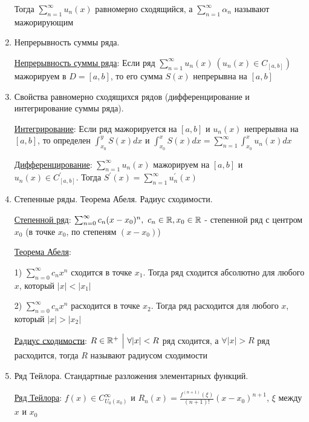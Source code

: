 \documentclass[12pt]{article}
\begin{document}
\begin{enumerate}
    Тогда $\sum_{n = 1}^\infty u_n(x)$ равномерно сходящийся, а $\sum_{n = 1}^\infty \alpha_n$ называют мажорирующим

    \item Непрерывность суммы ряда.

    \hyperlink{functionalsumcontinuity}{Непрерывность суммы ряда}: \Ths Если ряд $\sum_{n = 1}^\infty u_n(x) \ (u_n(x) \in C_{[a, b]})$ мажорируем в $D = [a, b]$, то 
    его сумма $S(x)$ непрерывна на $[a, b]$

    \item Свойства равномерно сходящихся рядов (дифференцирование и интегрирование суммы
    ряда).

    \hyperlink{functionalsumintegral}{Интегрирование}: \Ths Если ряд мажорируется на $[a, b]$ и $u_n(x)$ непрерывна на $[a, b]$, то определен $\int_{x_0}^y S(x)dx$ и 
    $\int_{x_0}^x S(x)dx  = \sum_{n = 1}^\infty \int_{x_0}^x u_n(x) dx$

    \hyperlink{functionalsumderivative}{Дифференцирование}: \Ths $\sum_{n = 1}^\infty u_n(x)$ мажорируем на $[a, b]$ и $u_n(x) \in C^\prime_{[a, b]}$.
    Тогда $S^\prime(x) = \sum_{n = 1}^\infty u^\prime_n(x)$

    \item Степенные ряды. Теорема Абеля. Радиус сходимости.

    \hyperlink{powerseries}{Степенной ряд}: $\sum_{n = 0}^\infty c_n(x - x_0)^n, \ c_n \in \mathbb{R}, x_0 \in \mathbb{R}$ - степенной ряд с центром $x_0$ (в точке $x_0$, по степеням $(x - x_0)$)

    \hyperlink{abelstheorem}{Теорема Абеля}:  

    1) $\sum_{n = 0}^\infty c_n x^n$ сходится в точке $x_1$. Тогда ряд сходится абсолютно для любого $x$, который $|x| < |x_1|$

    2) $\sum_{n = 0}^\infty c_n x^n$ расходится в точке $x_2$. Тогда ряд расходится для любого $x$, который $|x| > |x_2|$

    \hyperlink{convergenceradius}{Радиус сходимости}: $R \in \mathbb{R}^+ \ \Big| \ \forall |x| < R $ ряд сходится, а $\forall |x| > R$ ряд расходится, тогда $R$ называют радиусом сходимости

    \item Ряд Тейлора. Стандартные разложения элементарных функций.

    \hyperlink{taylorsseries}{Ряд Тейлора}: $f(x) \in C^\infty_{U_0(x_0)}$ и $R_n(x) = \frac{f^{(n + 1)}(\xi)}{(n + 1)!} (x - x_0)^{n + 1}$, $\xi$ между $x$ и $x_0$
    

\end{enumerate}
\end{document}

